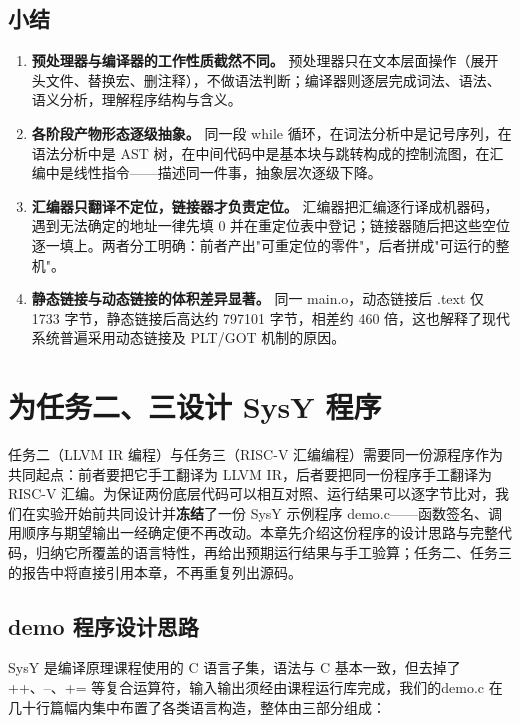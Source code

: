 \documentclass[UTF8,a4paper,10pt]{ctexart}
\begin{document}
\subsection{小结}

\begin{enumerate}[1.]
  \item \textbf{预处理器与编译器的工作性质截然不同。} 预处理器只在文本层面操作（展开头文件、替换宏、删注释），不做语法判断；编译器则逐层完成词法、语法、语义分析，理解程序结构与含义。

  \item \textbf{各阶段产物形态逐级抽象。} 同一段 while 循环，在词法分析中是记号序列，在语法分析中是 AST 树，在中间代码中是基本块与跳转构成的控制流图，在汇编中是线性指令——描述同一件事，抽象层次逐级下降。

  \item \textbf{汇编器只翻译不定位，链接器才负责定位。} 汇编器把汇编逐行译成机器码，遇到无法确定的地址一律先填 0 并在重定位表中登记；链接器随后把这些空位逐一填上。两者分工明确：前者产出"可重定位的零件"，后者拼成"可运行的整机"。

  \item \textbf{静态链接与动态链接的体积差异显著。} 同一 main.o，动态链接后 .text 仅 1733 字节，静态链接后高达约 797101 字节，相差约 460 倍，这也解释了现代系统普遍采用动态链接及 PLT/GOT 机制的原因。
\end{enumerate}

\section{为任务二、三设计 SysY 程序}

任务二（LLVM IR 编程）与任务三（RISC-V 汇编编程）需要同一份源程序作为共同起点：前者要把它手工翻译为 LLVM IR，后者要把同一份程序手工翻译为 RISC-V 汇编。为保证两份底层代码可以相互对照、运行结果可以逐字节比对，我们在实验开始前共同设计并\textbf{冻结}了一份 SysY 示例程序 demo.c——函数签名、调用顺序与期望输出一经确定便不再改动。本章先介绍这份程序的设计思路与完整代码，归纳它所覆盖的语言特性，再给出预期运行结果与手工验算；任务二、任务三的报告中将直接引用本章，不再重复列出源码。

\subsection{demo 程序设计思路}

SysY 是编译原理课程使用的 C 语言子集，语法与 C 基本一致，但去掉了 ++、--、+= 等复合运算符，输入输出须经由课程运行库完成，我们的demo.c 在几十行篇幅内集中布置了各类语言构造，整体由三部分组成：
\end{document}
